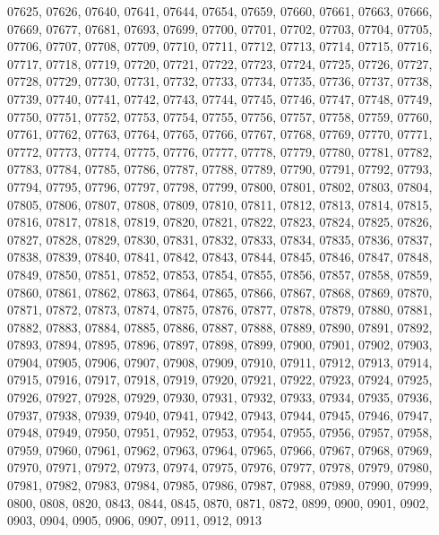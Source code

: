 {07625,
07626,
07640,
07641,
07644,
07654,
07659,
07660,
07661,
07663,
07666,
07669,
07677,
07681,
07693,
07699,
07700,
07701,
07702,
07703,
07704,
07705,
07706,
07707,
07708,
07709,
07710,
07711,
07712,
07713,
07714,
07715,
07716,
07717,
07718,
07719,
07720,
07721,
07722,
07723,
07724,
07725,
07726,
07727,
07728,
07729,
07730,
07731,
07732,
07733,
07734,
07735,
07736,
07737,
07738,
07739,
07740,
07741,
07742,
07743,
07744,
07745,
07746,
07747,
07748,
07749,
07750,
07751,
07752,
07753,
07754,
07755,
07756,
07757,
07758,
07759,
07760,
07761,
07762,
07763,
07764,
07765,
07766,
07767,
07768,
07769,
07770,
07771,
07772,
07773,
07774,
07775,
07776,
07777,
07778,
07779,
07780,
07781,
07782,
07783,
07784,
07785,
07786,
07787,
07788,
07789,
07790,
07791,
07792,
07793,
07794,
07795,
07796,
07797,
07798,
07799,
07800,
07801,
07802,
07803,
07804,
07805,
07806,
07807,
07808,
07809,
07810,
07811,
07812,
07813,
07814,
07815,
07816,
07817,
07818,
07819,
07820,
07821,
07822,
07823,
07824,
07825,
07826,
07827,
07828,
07829,
07830,
07831,
07832,
07833,
07834,
07835,
07836,
07837,
07838,
07839,
07840,
07841,
07842,
07843,
07844,
07845,
07846,
07847,
07848,
07849,
07850,
07851,
07852,
07853,
07854,
07855,
07856,
07857,
07858,
07859,
07860,
07861,
07862,
07863,
07864,
07865,
07866,
07867,
07868,
07869,
07870,
07871,
07872,
07873,
07874,
07875,
07876,
07877,
07878,
07879,
07880,
07881,
07882,
07883,
07884,
07885,
07886,
07887,
07888,
07889,
07890,
07891,
07892,
07893,
07894,
07895,
07896,
07897,
07898,
07899,
07900,
07901,
07902,
07903,
07904,
07905,
07906,
07907,
07908,
07909,
07910,
07911,
07912,
07913,
07914,
07915,
07916,
07917,
07918,
07919,
07920,
07921,
07922,
07923,
07924,
07925,
07926,
07927,
07928,
07929,
07930,
07931,
07932,
07933,
07934,
07935,
07936,
07937,
07938,
07939,
07940,
07941,
07942,
07943,
07944,
07945,
07946,
07947,
07948,
07949,
07950,
07951,
07952,
07953,
07954,
07955,
07956,
07957,
07958,
07959,
07960,
07961,
07962,
07963,
07964,
07965,
07966,
07967,
07968,
07969,
07970,
07971,
07972,
07973,
07974,
07975,
07976,
07977,
07978,
07979,
07980,
07981,
07982,
07983,
07984,
07985,
07986,
07987,
07988,
07989,
07990,
07999,
0800,
0808,
0820,
0843,
0844,
0845,
0870,
0871,
0872,
0899,
0900,
0901,
0902,
0903,
0904,
0905,
0906,
0907,
0911,
0912,
0913}
